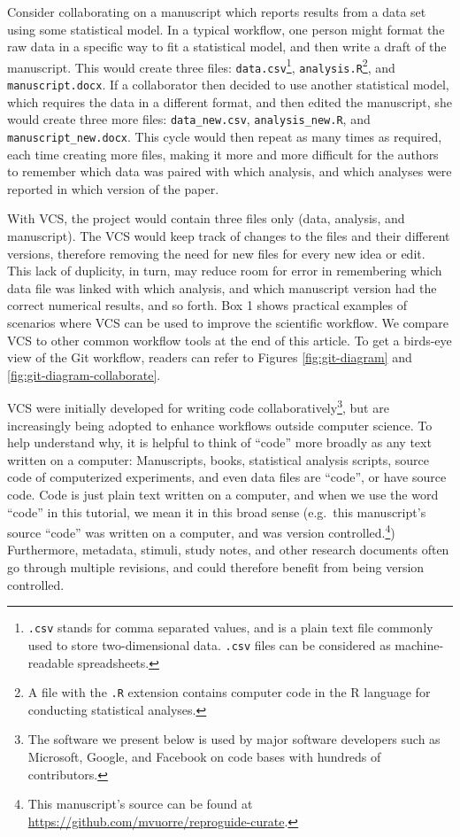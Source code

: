 \documentclass[
  american,
  ,doc,floatsintext]{apa6}
\begin{document}
Consider collaborating on a manuscript which reports results from a data set using some statistical model. In a typical workflow, one person might format the raw data in a specific way to fit a statistical model, and then write a draft of the manuscript. This would create three files: \texttt{data.csv}\footnote{\texttt{.csv} stands for comma separated values, and is a plain text file commonly used to store two-dimensional data. \texttt{.csv} files can be considered as machine-readable spreadsheets.}, \texttt{analysis.R}\footnote{A file with the \texttt{.R} extension contains computer code in the R language for conducting statistical analyses.}, and \texttt{manuscript.docx}. If a collaborator then decided to use another statistical model, which requires the data in a different format, and then edited the manuscript, she would create three more files: \texttt{data\_new.csv}, \texttt{analysis\_new.R}, and \texttt{manuscript\_new.docx}. This cycle would then repeat as many times as required, each time creating more files, making it more and more difficult for the authors to remember which data was paired with which analysis, and which analyses were reported in which version of the paper.

With VCS, the project would contain three files only (data, analysis, and manuscript). The VCS would keep track of changes to the files and their different versions, therefore removing the need for new files for every new idea or edit. This lack of duplicity, in turn, may reduce room for error in remembering which data file was linked with which analysis, and which manuscript version had the correct numerical results, and so forth. Box 1 shows practical examples of scenarios where VCS can be used to improve the scientific workflow. We compare VCS to other common workflow tools at the end of this article. To get a birds-eye view of the Git workflow, readers can refer to Figures \ref{fig:git-diagram} and \ref{fig:git-diagram-collaborate}.

VCS were initially developed for writing code collaboratively\footnote{The software we present below is used by major software developers such as Microsoft, Google, and Facebook on code bases with hundreds of contributors.}, but are increasingly being adopted to enhance workflows outside computer science. To help understand why, it is helpful to think of \enquote{code} more broadly as any text written on a computer: Manuscripts, books, statistical analysis scripts, source code of computerized experiments, and even data files are \enquote{code}, or have source code. Code is just plain text written on a computer, and when we use the word \enquote{code} in this tutorial, we mean it in this broad sense (e.g.~this manuscript's source \enquote{code} was written on a computer, and was version controlled.\footnote{This manuscript's source can be found at \url{https://github.com/mvuorre/reproguide-curate}.}) Furthermore, metadata, stimuli, study notes, and other research documents often go through multiple revisions, and could therefore benefit from being version controlled.
\end{document}

